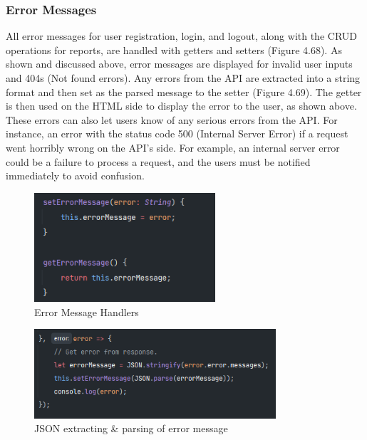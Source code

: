 \subsubsection{Error Messages}
All error messages for user registration, login, and logout, along with the CRUD operations for reports, are handled with getters and setters (Figure 4.68). As shown and discussed above, error messages are displayed for invalid user inputs and 404s (Not found errors). Any errors from the API are extracted into a string format and then set as the parsed message to the setter (Figure 4.69). The getter is then used on the HTML side to display the error to the user, as shown above. These errors can also let users know of any serious errors from the API. For instance, an error with the status code 500 (Internal Server Error) if a request went horribly wrong on the API's side. For example, an internal server error could be a failure to process a request, and the users must be notified immediately to avoid confusion.

\begin{figure}[H]
    \centering
    \caption{Error Message Handlers}
    \label{image:errorMessageHandlers}
    \includegraphics[width=0.6\textwidth]{images/repota/report_pages/error_handlers.png}
\end{figure}

\begin{figure}[H]
    \centering
    \caption{JSON extracting \& parsing of error message}
    \label{image:letError}
    \includegraphics[width=0.8\textwidth]{images/repota/report_pages/let_error.png}
\end{figure}

